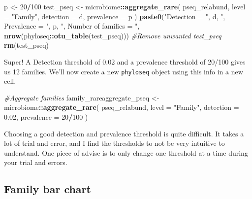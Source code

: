 \documentclass[
]{book}
\newenvironment{Shaded}{\begin{snugshade}}{\end{snugshade}}
\newcommand{\AttributeTok}[1]{\textcolor[rgb]{0.13,0.29,0.53}{#1}}
\newcommand{\CommentTok}[1]{\textcolor[rgb]{0.56,0.35,0.01}{\textit{#1}}}
\newcommand{\DecValTok}[1]{\textcolor[rgb]{0.00,0.00,0.81}{#1}}
\newcommand{\FloatTok}[1]{\textcolor[rgb]{0.00,0.00,0.81}{#1}}
\newcommand{\FunctionTok}[1]{\textcolor[rgb]{0.13,0.29,0.53}{\textbf{#1}}}
\newcommand{\NormalTok}[1]{#1}
\newcommand{\OtherTok}[1]{\textcolor[rgb]{0.56,0.35,0.01}{#1}}
\newcommand{\SpecialCharTok}[1]{\textcolor[rgb]{0.81,0.36,0.00}{\textbf{#1}}}
\newcommand{\StringTok}[1]{\textcolor[rgb]{0.31,0.60,0.02}{#1}}
\begin{document}
\begin{Shaded}
\begin{Highlighting}[]
\NormalTok{p }\OtherTok{\textless{}{-}} \DecValTok{20}\SpecialCharTok{/}\DecValTok{100}
\NormalTok{test\_pseq }\OtherTok{\textless{}{-}}\NormalTok{ microbiome}\SpecialCharTok{::}\FunctionTok{aggregate\_rare}\NormalTok{(}
\NormalTok{  pseq\_relabund, }\AttributeTok{level =} \StringTok{"Family"}\NormalTok{,}
  \AttributeTok{detection =}\NormalTok{ d, }\AttributeTok{prevalence =}\NormalTok{ p}
\NormalTok{)}
\FunctionTok{paste0}\NormalTok{(}\StringTok{"Detection = "}\NormalTok{, d, }\StringTok{", Prevalence = "}\NormalTok{, p,}
       \StringTok{", Number of families = "}\NormalTok{, }\FunctionTok{nrow}\NormalTok{(phyloseq}\SpecialCharTok{::}\FunctionTok{otu\_table}\NormalTok{(test\_pseq)))}
\CommentTok{\#Remove unwanted test\_pseq}
\FunctionTok{rm}\NormalTok{(test\_pseq)}
\end{Highlighting}
\end{Shaded}

Super!
A Detection threshold of 0.02 and a prevalence threshold of 20/100 gives us 12 families.
We'll now create a new \texttt{phyloseq} object using this info in a new cell.

\begin{Shaded}
\begin{Highlighting}[]
\CommentTok{\#Aggregate families}
\NormalTok{family\_rareaggregate\_pseq }\OtherTok{\textless{}{-}}\NormalTok{ microbiome}\SpecialCharTok{::}\FunctionTok{aggregate\_rare}\NormalTok{(}
\NormalTok{  pseq\_relabund, }\AttributeTok{level =} \StringTok{"Family"}\NormalTok{,}
  \AttributeTok{detection =} \FloatTok{0.02}\NormalTok{, }\AttributeTok{prevalence =} \DecValTok{20}\SpecialCharTok{/}\DecValTok{100}
\NormalTok{)}
\end{Highlighting}
\end{Shaded}

Choosing a good detection and prevalence threshold is quite difficult.
It takes a lot of trial and error, and I find the thresholds to not be very intuitive to understand.
One piece of advise is to only change one threshold at a time during your trial and errors.

\hypertarget{family-bar-chart}{%
\subsection{Family bar chart}\label{family-bar-chart}}
\end{document}
